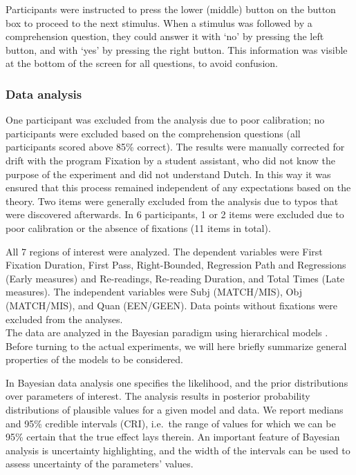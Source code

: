 \documentclass[11pt]{article} %
\begin{document}
Participants were instructed to press the lower (middle) button on the button box to proceed to the next stimulus. When a stimulus was followed by a comprehension question, they could answer it with `no' by pressing the left button, and with `yes' by pressing the right button. This information was visible at the bottom of the screen for all questions, to avoid confusion. 


\subsubsection{Data analysis}
One participant was excluded from the analysis due to poor calibration; no participants were excluded based on the comprehension questions (all participants scored above 85\% correct). The results were manually corrected for drift with the program Fixation by a student assistant, who did not know the purpose of the experiment and did not understand Dutch. In this way it was ensured that this process remained independent of any expectations based on the theory. Two items were generally excluded from the analysis due to typos that were discovered afterwards. In 6 participants, 1 or 2 items were excluded due to poor calibration or the absence of fixations (11 items in total).

All 7 regions of interest were analyzed. The dependent variables were First Fixation Duration, First Pass, Right-Bounded, Regression Path and Regressions (Early measures) and Re-readings, Re-reading Duration, and Total Times (Late measures). The independent variables were Subj (MATCH/MIS), Obj (MATCH/MIS), and Quan (EEN/GEEN). Data points without fixations were excluded from the analyses. \\

The data are analyzed in the Bayesian paradigm using hierarchical models
\citep{gelman2003bda,gelman2006data,mcelreath2018statistical,nicenboim2021introd_bayes_data}.
Before turning to the actual experiments, we will here briefly summarize
general properties of the models to be considered.

In Bayesian data analysis one specifies the likelihood, and the prior
distributions over parameters of interest. The analysis results in
posterior probability distributions of plausible values for a given
model and data. We report medians and 95\% credible intervals (CRI),
i.e.~the range of values for which we can be 95\% certain that the true
effect lays therein. An important feature of Bayesian analysis is
uncertainty highlighting, and the width of the intervals can be used to
assess uncertainty of the parameters' values.
\end{document}
